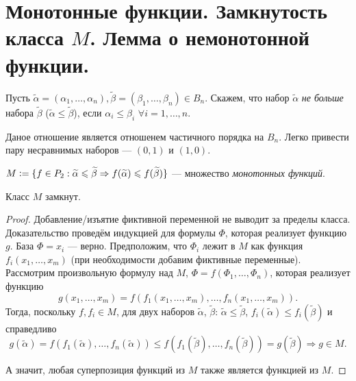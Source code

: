\section{Монотонные функции. Замкнутость класса $M$. Лемма о немонотонной функции.}

\begin{definition}
    Пусть $\widetilde{\alpha} = (\alpha_1, \ldots, \alpha_n), \widetilde{\beta} = (\beta_1, \ldots, \beta_n) \in B_n$. Скажем, что набор $\widetilde{\alpha}$ \textit{не больше} набора $\widetilde{\beta}$ ($\widetilde{\alpha} \leqslant \widetilde{\beta}$), если $\alpha_i \leqslant \beta_i$ $\forall i = 1, \ldots, n$.
\end{definition}

\begin{remark}
    Даное отношение является отношенем частичного порядка на $B_n$. Легко привести пару несравнимых наборов --- $(0, 1)$ и $(1, 0)$.
\end{remark}

\begin{definition}
    $M \vcentcolon = \{f \in P_2 : \widetilde{\alpha} \leqslant \widetilde{\beta} \Rightarrow f(\widetilde{\alpha}) \leqslant f(\widetilde{\beta})\}$ --- множество \textit{монотонных функций}.
\end{definition}

\begin{theorem}
    Класс $M$ замкнут.
\end{theorem}

\begin{proof}
    Добавление/изъятие фиктивной переменной не выводит за пределы класса.\\ 
    Доказательство проведём индукцией для формулы $\Phi$, которая реализует функцию $g$. База $\Phi = x_i$ --- верно. Предположим, что $\Phi_i$ лежит в $M$ как функция $f_i(x_1,\ldots,x_m)$ (при необходимости добавим фиктивные переменные). Рассмотрим произвольную формулу над $M$, $\Phi = f(\Phi_1, \ldots, \Phi_n)$, которая реализует функцию
    \[
        g(x_1,\ldots, x_m) = f(f_1(x_1, \ldots, x_m), \ldots, f_n(x_1, \ldots, x_m)).
    \]
    Тогда, поскольку $f, f_i \in M$, для двух наборов $\widetilde{\alpha}$, $\widetilde{\beta}$: $\widetilde{\alpha} \leqslant \widetilde{\beta}$, $f_i(\widetilde{\alpha}) \leqslant f_i(\widetilde{\beta})$ и справедливо
    \[
        g(\widetilde{\alpha}) = f(f_1(\widetilde{\alpha}), \ldots, f_n(\widetilde{\alpha})) \leqslant f(f_1(\widetilde{\beta}), \ldots, f_n(\widetilde{\beta})) = g(\widetilde{\beta}) \Rightarrow g \in M.
    \]
    
    А значит, любая суперпозиция функций из $M$ также является функцией из $M$.
\end{proof}

